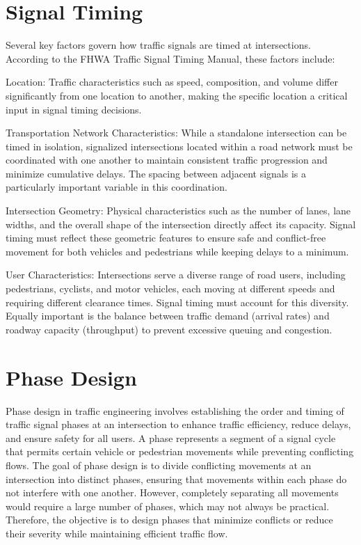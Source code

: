\section{Signal Timing}

Several key factors govern how traffic signals are timed at intersections. According to the FHWA Traffic Signal Timing Manual, these factors include:

Location: Traffic characteristics such as speed, 
composition, and volume differ significantly from one 
location to another, making the specific location a critical 
input in signal timing decisions.

Transportation Network Characteristics: While a 
standalone intersection can be timed in isolation, 
signalized intersections located within a road network must 
be coordinated with one another to maintain consistent 
traffic progression and minimize cumulative delays. The 
spacing between adjacent signals is a particularly important 
variable in this coordination.

Intersection Geometry: Physical characteristics 
such as the number of lanes, lane widths, and the overall 
shape of the intersection directly affect its capacity. 
Signal timing must reflect these geometric features to 
ensure safe and conflict-free movement for both vehicles and 
pedestrians while keeping delays to a minimum.

User Characteristics: Intersections serve a diverse 
range of road users, including pedestrians, cyclists, and 
motor vehicles, each moving at different speeds and 
requiring different clearance times. Signal timing must 
account for this diversity. Equally important is the balance 
between traffic demand (arrival rates) and roadway capacity 
(throughput) to prevent excessive queuing and congestion.

\section{Phase Design}
Phase design in traffic engineering involves establishing 
the order and timing of traffic signal phases at an 
intersection to enhance traffic efficiency, reduce delays, 
and ensure safety for all users. A phase represents a 
segment of a signal cycle that permits certain vehicle or 
pedestrian movements while preventing conflicting flows. 
The goal of phase design is to divide conflicting movements 
at an intersection into distinct phases, ensuring that 
movements within each phase do not interfere with one another. 
However, completely separating all movements would require a 
large number of phases, which may not always be practical. 
Therefore, the objective is to design phases that minimize
conflicts or reduce their severity while maintaining 
efficient traffic flow.

